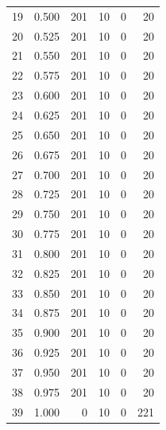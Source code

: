 \documentclass[a4paper,twoside,12pt]{book}
\begin{document}
\begin{appendices}
\begin{table}
\begin{tabular}{lrrrrr}
		19 &  0.500 &       201 &        10 &               0 &              20 \\
		20 &  0.525 &       201 &        10 &               0 &              20 \\
		21 &  0.550 &       201 &        10 &               0 &              20 \\
		22 &  0.575 &       201 &        10 &               0 &              20 \\
		23 &  0.600 &       201 &        10 &               0 &              20 \\
		24 &  0.625 &       201 &        10 &               0 &              20 \\
		25 &  0.650 &       201 &        10 &               0 &              20 \\
		26 &  0.675 &       201 &        10 &               0 &              20 \\
		27 &  0.700 &       201 &        10 &               0 &              20 \\
		28 &  0.725 &       201 &        10 &               0 &              20 \\
		29 &  0.750 &       201 &        10 &               0 &              20 \\
		30 &  0.775 &       201 &        10 &               0 &              20 \\
		31 &  0.800 &       201 &        10 &               0 &              20 \\
		32 &  0.825 &       201 &        10 &               0 &              20 \\
		33 &  0.850 &       201 &        10 &               0 &              20 \\
		34 &  0.875 &       201 &        10 &               0 &              20 \\
		35 &  0.900 &       201 &        10 &               0 &              20 \\
		36 &  0.925 &       201 &        10 &               0 &              20 \\
		37 &  0.950 &       201 &        10 &               0 &              20 \\
		38 &  0.975 &       201 &        10 &               0 &              20 \\
		39 &  1.000 &         0 &        10 &               0 &             221 \\
		\bottomrule
	\end{tabular}				
\end{table}


\end{appendices}
\end{document}
